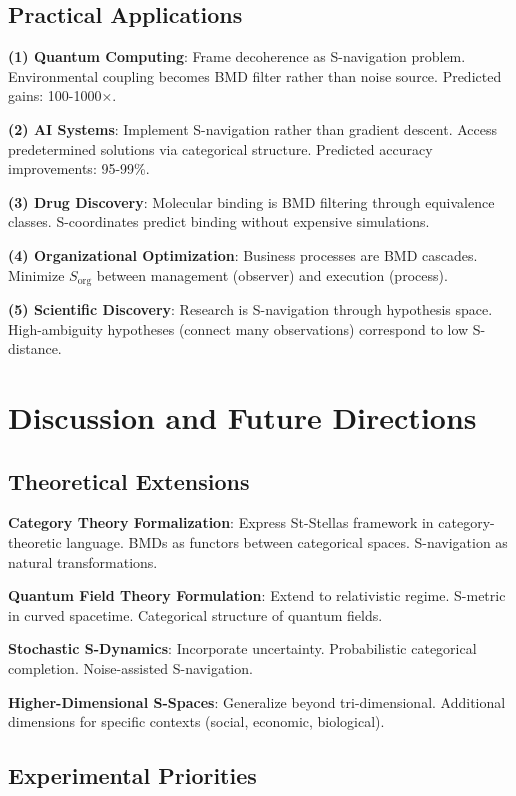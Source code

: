 \documentclass[12pt,a4paper]{article}
\begin{document}
\subsection{Practical Applications}

\textbf{(1) Quantum Computing}: Frame decoherence as S-navigation problem. Environmental coupling becomes BMD filter rather than noise source. Predicted gains: 100-1000×.

\textbf{(2) AI Systems}: Implement S-navigation rather than gradient descent. Access predetermined solutions via categorical structure. Predicted accuracy improvements: 95-99\%.

\textbf{(3) Drug Discovery}: Molecular binding is BMD filtering through equivalence classes. S-coordinates predict binding without expensive simulations.

\textbf{(4) Organizational Optimization}: Business processes are BMD cascades. Minimize $S_{\text{org}}$ between management (observer) and execution (process).

\textbf{(5) Scientific Discovery}: Research is S-navigation through hypothesis space. High-ambiguity hypotheses (connect many observations) correspond to low S-distance.

\section{Discussion and Future Directions}

\subsection{Theoretical Extensions}

\textbf{Category Theory Formalization}: Express St-Stellas framework in category-theoretic language. BMDs as functors between categorical spaces. S-navigation as natural transformations.

\textbf{Quantum Field Theory Formulation}: Extend to relativistic regime. S-metric in curved spacetime. Categorical structure of quantum fields.

\textbf{Stochastic S-Dynamics}: Incorporate uncertainty. Probabilistic categorical completion. Noise-assisted S-navigation.

\textbf{Higher-Dimensional S-Spaces}: Generalize beyond tri-dimensional. Additional dimensions for specific contexts (social, economic, biological).

\subsection{Experimental Priorities}
\end{document}
